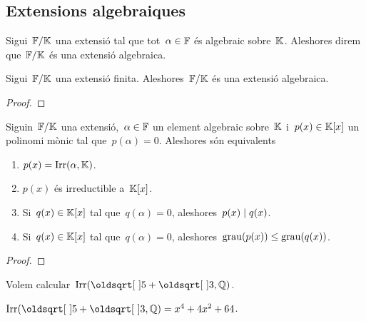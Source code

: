 \documentclass[../Apunts.tex]{subfiles}
\begin{document}
\subsection{Extensions algebraiques}
	\begin{definition}
		\label{def:extensió algebraica}
		Sigui~\(\mathbb{F}/\mathbb{K}\) una extensió tal que tot~\(\alpha\in\mathbb{F}\) és algebraic sobre~\(\mathbb{K}\). Aleshores direm que~\(\mathbb{F}/\mathbb{K}\) és una extensió algebraica.
	\end{definition}
	\begin{proposition}
		\label{prop:les extensions finites són algebraiques}
		Sigui~\(\mathbb{F}/\mathbb{K}\) una extensió finita. Aleshores~\(\mathbb{F}/\mathbb{K}\) és una extensió algebraica.
		\begin{proof}
		\end{proof}
	\end{proposition}
	\begin{lemma}
		\label{lema:condicions equivalents a polinomi irreductible}
		Siguin~\(\mathbb{F}/\mathbb{K}\) una extensió,~\(\alpha\in\mathbb{F}\) un element algebraic sobre~\(\mathbb{K}\) i~\(p(x)\in\mathbb{K}[x]\) un polinomi mònic tal que~\(p(\alpha)=0\). Aleshores són equivalents
		\begin{enumerate}
		\item \(p(x)=\operatorname{Irr}(\alpha,\mathbb{K})\).
		\item \(p(x)\) és irreductible a~\(\mathbb{K}[x]\).
		\item Si~\(q(x)\in\mathbb{K}[x]\) tal que~\(q(\alpha)=0\), aleshores~\(p(x)\mathrel{|} q(x)\).
		\item Si~\(q(x)\in\mathbb{K}[x]\) tal que~\(q(\alpha)=0\), aleshores~\(\operatorname{grau}(p(x))\leq\operatorname{grau}(q(x))\).
		\end{enumerate}
		\begin{proof}
		\end{proof}
	\end{lemma}
	\begin{example}
		Volem calcular~\(\Irr(\sqrt{5}+\sqrt{3},\QQ)\).
		\begin{solution}
			\(\Irr(\sqrt{5}+\sqrt{3},\QQ)=x^{4}+4x^{2}+64\).
		\end{solution}
	\end{example}
\end{document}
